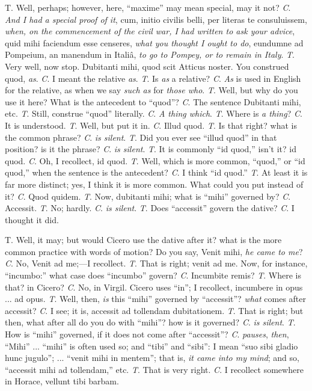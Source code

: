 T. Well, perhaps; however, here, ``maxime'' may mean
special, may it not? \emph{C}. \emph{And I had a special proof of it},
cum, initio civilis belli, per literas te consuluissem, \emph{when, on
the commencement of the civil war, I had written to ask your advice},
quid mihi faciendum esse censeres, \emph{what you thought I ought to do},
eundumne ad Pompeium, an manendum in Italiâ, \emph{to go to Pompey, or
to remain in Italy}.
\emph{T}. Very well, now stop. Dubitanti mihi, quod scit Atticus
noster. You construed quod, \emph{as}. \emph{C}. I meant the relative \emph{as}.
\emph{T}. Is \emph{as} a relative? \emph{C}. \emph{As} is used in
English for the relative, as when we say \emph{such as} for \emph{those
who}.
\emph{T}. Well, but why do you use it here? What is the antecedent to ``quod''? \emph{C}. The sentence Dubitanti mihi,
etc.
\emph{T}. Still, construe ``quod'' literally. \emph{C}. \emph{A
thing which}.
\emph{T}. Where is \emph{a thing}? \emph{C}. It is understood.
\emph{T}. Well, but put it in. \emph{C}. Illud quod.
\emph{T}. Is that right? what is the common phrase? \emph{C}. \emph{is
silent}.
\emph{T}. Did you ever see ``illud quod'' in that position? is
it the phrase? \emph{C}. \emph{is silent}.
\emph{T}. It is commonly ``id quod,'' isn't it? id quod. \emph{C}.
Oh, I recollect, id quod.
\emph{T}. Well, which is more common, ``quod,'' or ``id
quod,'' when the sentence is the antecedent? \emph{C}. I think
``id quod.''
\emph{T}. At least it is far more distinct; yes, I think it is more
common. What could you put instead of it? \emph{C}. Quod quidem.
\emph{T}. Now, dubitanti mihi; what is ``mihi'' governed by? \emph{C}.
Accessit.
\emph{T}. No; hardly. \emph{C}. \emph{is silent}.
\emph{T}. Does ``accessit'' govern the dative? \emph{C}. I
thought it did.

T. Well, it may; but would Cicero use the dative after it? what is
the more common practice with words of motion? Do you say, Venit mihi,
\emph{he came to me}? \emph{C}. No, Venit ad me;—I recollect.
\emph{T}. That is right; venit ad me. Now, for instance, ``incumbo:''
what case does ``incumbo'' govern? \emph{C}. Incumbite remis?
\emph{T}. Where is that? in Cicero? \emph{C}. No, in Virgil. Cicero
uses ``in''; I recollect, incumbere in opus ... ad opus.
\emph{T}. Well, then, \emph{is} this ``mihi'' governed by
``accessit''? \emph{what} comes after accessit? \emph{C}. I
see; it is, accessit ad tollendam dubitationem. \emph{T}. That is right; but then, what after all do you do with
``mihi''? how is it governed? \emph{C}. \emph{is silent}.
\emph{T}. How is ``mihi'' governed, if it does not come after
``accessit''? \emph{C}. \emph{pauses}, \emph{then}, ``Mihi''
... ``mihi'' is often used so; and ``tibi'' and ``sibi'':
I mean ``suo sibi gladio hunc jugulo''; ... ``venit mihi
in mentem''; that is, \emph{it came into my mind}; and so, ``accessit
mihi ad tollendam,'' etc.
\emph{T}. That is very right. \emph{C}. I recollect somewhere in
Horace, vellunt tibi barbam.

